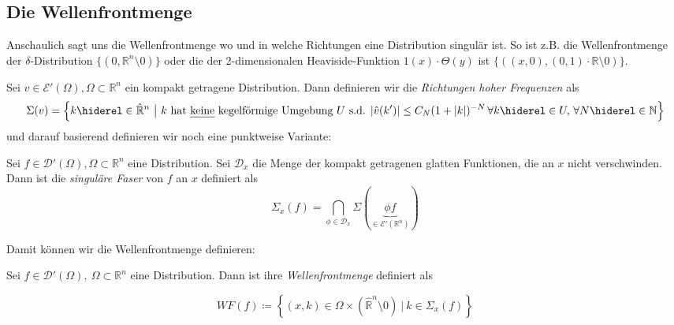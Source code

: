 \subsection{Die Wellenfrontmenge}
\label{sec:wavefrontset}

Anschaulich sagt uns die Wellenfrontmenge wo und in welche Richtungen eine Distribution singulär ist. So ist z.B. die Wellenfrontmenge der $\delta$-Distribution $\{(0, \mathbb{R}^n \setminus 0)\}$ oder die der 2-dimensionalen Heaviside-Funktion $1(x)\cdot\Theta(y)$ ist $\{((x,0),(0,1)\cdot \mathbb{R}\setminus 0)\}$.

\begin{definition}
\label{def:high_frequency_set}
Sei $v \in \mathcal{E}'(\Omega), \Omega \subset \mathbb{R}^n$ ein kompakt getragene Distribution. Dann definieren wir die \emph{Richtungen hoher Frequenzen} als
\begin{dmath*}
\Sigma (v) = \left\{k \hiderel \in \hat{\mathbb{R}}^n ~\big|~ k \textrm{ hat \emph{keine} kegelförmige Umgebung $U$ s.d. } \\ |\hat v (k')| \leq C_N(1+|k|)^{-N} \, \forall k \hiderel\in U,\, \forall N  \hiderel\in \mathbb{N} \right\}
\end{dmath*}
und darauf basierend definieren wir noch eine punktweise Variante:

Sei $f \in \mathcal{D}'(\Omega), \Omega \subset \mathbb{R}^n$ eine Distribution.
Sei $\mathcal{D}_x$ die Menge der kompakt getragenen glatten Funktionen, die an $x$ nicht verschwinden.
Dann ist die \emph{singuläre Faser} von $f$ an $x$ definiert als
\begin{dmath*}
\Sigma_x (f) = \bigcap \limits_{\phi \in \mathcal{D}_x} \Sigma (\underbrace{\phi f}_{\in \mathcal{E}'(\mathbb{R}^n)})
\end{dmath*}
\end{definition}

Damit können wir die Wellenfrontmenge definieren:

\begin{definition}[Wellenfrontmenge]
\label{def:wavefrontset}
Sei $f \in \mathcal{D}'(\Omega), ~\Omega \subset \mathbb{R}^n$ eine Distribution. Dann ist ihre \emph{Wellenfrontmenge} definiert als

\begin{equation*}
WF(f)  \coloneqq \left\{
	(x,k) \in \Omega \times (\hat{\mathbb{R}}^n \setminus 0)
	~\Big|~ k \in \Sigma_x(f)
	\right\}
\end{equation*}
\end{definition}

